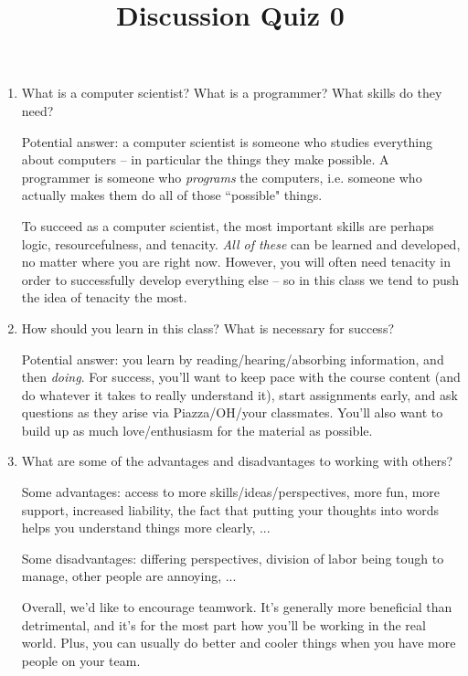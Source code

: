 \documentclass[twoside]{article}
\title{\sc Discussion Quiz 0 \solution{Solutions}}
\newcommand{\solution}[1]{{\color{red}#1}}
\begin{document}
\maketitle

\begin{enumerate}
\begin{enumerate}
\item What is a computer scientist? What is a programmer? What skills do they need?

\solution{Potential answer: a computer scientist is someone who studies everything about computers -- in particular the things they make possible. A programmer is someone who \textit{programs} the computers, i.e. someone who actually makes them do all of those ``possible" things. 

To succeed as a computer scientist, the most important skills are perhaps logic, resourcefulness, and tenacity. \textit{All of these} can be learned and developed, no matter where you are right now. However, you will often need tenacity in order to successfully develop everything else -- so in this class we tend to push the idea of tenacity the most.}
\newline

\item How should you learn in this class? What is necessary for success?

\solution{Potential answer: you learn by reading/hearing/absorbing information, and then \textit{doing}. For success, you'll want to keep pace with the course content (and do whatever it takes to really understand it), start assignments early, and ask questions as they arise via Piazza/OH/your classmates. You'll also want to build up as much love/enthusiasm for the material as possible.}
\newline

\item What are some of the advantages and disadvantages to working with others?

\solution{Some advantages: access to more skills/ideas/perspectives, more fun, more support, increased liability, the fact that putting your thoughts into words helps you understand things more clearly, ...

Some disadvantages: differing perspectives, division of labor being tough to manage, other people are annoying, ...

Overall, we'd like to encourage teamwork. It's generally more beneficial than detrimental, and it's for the most part how you'll be working in the real world. Plus, you can usually do better and cooler things when you have more people on your team.}
\newline


\end{enumerate}
\end{enumerate}
\end{document}

